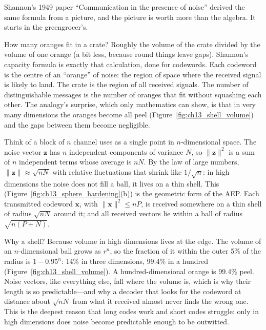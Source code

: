 Shannon's 1949 paper ``Communication in the presence of noise'' derived the same formula from a
picture, and the picture is worth more than the algebra. It starts in the greengrocer's.

\begin{analogy}
How many oranges fit in a crate? Roughly the volume of the crate divided by the volume of one
orange (a bit less, because round things leave gaps). Shannon's capacity formula is exactly that
calculation, done for codewords. Each codeword is the centre of an ``orange'' of noise: the
region of space where the received signal is likely to land. The crate is the region of all
received signals. The number of distinguishable messages is the number of oranges that fit
without squashing each other. The analogy's surprise, which only mathematics can show, is that
in very many dimensions the oranges become all peel (Figure~\ref{fig:ch13_shell_volume}) and the
gaps between them become negligible.
\end{analogy}

Think of a block of $n$ channel uses as a single point in $n$-dimensional space. The noise vector
$\mathbf{z}$ has $n$ independent components of variance $N$, so $\|\mathbf{z}\|^2$ is a sum of $n$
independent terms whose average is $nN$. By the law of large numbers, $\|\mathbf{z}\|\approx\sqrt{nN}$
with relative fluctuations that shrink like $1/\sqrt n$: in high dimensions the noise does not fill
a ball, it lives on a thin shell. This 
(Figure~\ref{fig:ch13_sphere_hardening}(b)) is the geometric form of the AEP. Each transmitted
codeword $\mathbf{x}$, with $\|\mathbf{x}\|^2\le nP$, is received somewhere on a thin shell of radius
$\sqrt{nN}$ around it; and all received vectors lie within a ball of radius $\sqrt{n(P+N)}$.


Why a shell? Because volume in high dimensions lives at the edge. The volume of an
$n$-dimensional ball grows as $r^n$, so the fraction of it within the outer 5\% of the radius is
$1-0.95^n$: 14\% in three dimensions, 99.4\% in a hundred (Figure~\ref{fig:ch13_shell_volume}). A
hundred-dimensional orange is 99.4\% peel. Noise vectors, like everything else, fall where the
volume is, which is why their length is so predictable---and why a decoder that looks for the
codeword at distance about $\sqrt{nN}$ from what it received almost never finds the wrong one.
This is the deepest reason that long codes work and short codes struggle: only in high dimensions
does noise become predictable enough to be outwitted.

